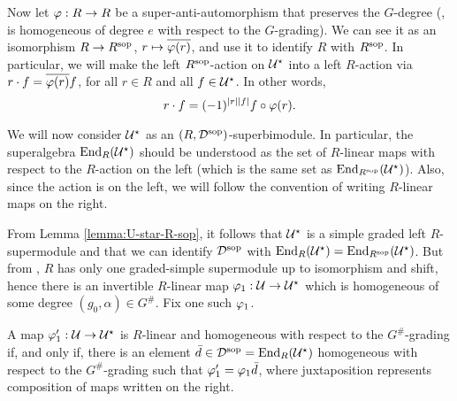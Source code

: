 
Now let $\varphi: R\to R$ be a super-anti-automorphism that preserves the $G$-degree (\ie, is homogeneous of degree $e$ with respect to the $G$-grading).
We can see it as an isomorphism $R\to R^{\mathrm{sop}}$, $r \mapsto \overline{ \varphi(r)}$, and use it to identify $R$ with $R^{\mathrm{sop}}$.
In particular, we will make the left $R^{\mathrm{sop}}$-action on $\mathcal U^\star$ into a left $R$-action via $r\cdot f = \overline{\varphi(r)}f$, for all $r\in R$ and all $f\in \mathcal U^\star$.
In other words,
%
\begin{equation}\label{eq:R-action-back-on-the-right}
	r\cdot f = (-1)^{|r||f|} f \circ \varphi(r) .
\end{equation}

We will now consider $\mathcal U^\star$ as an $(R,\mathcal{D}^{\mathrm{sop}})$-superbimodule.
In particular, the superalgebra $\operatorname{End}_R(\mathcal U^\star)$ should be understood as the set of $R$-linear maps with respect to the $R$-action on the left (which is the same set as $\operatorname{End}_{R^{\mathrm{sop}}} (\mathcal U^\star)$).
Also, since the action is on the left, we will follow the convention of writing $R$-linear maps on the right.

From Lemma \ref{lemma:U-star-R-sop}, it follows that $\mathcal U^\star$ is a simple graded left $R$-supermodule and that we can identify $\mathcal{D}^{\mathrm{sop}}$ with $\operatorname{End}_R (\mathcal U^\star) = \operatorname{End}_{R^{\mathrm{sop}}} (\mathcal U^\star)$.
But from \cite[Lemma 2.7]{livromicha}, $R$ has only one graded-simple supermodule up to isomorphism and shift, hence there is an invertible $R$-linear map $\varphi_1: \mathcal U \to \mathcal U^\star$ which is homogeneous of some degree $(g_0, \alpha)\in G^\#$.
Fix one such $\varphi_1$.

\begin{lemma}\label{lemma:nonuniqueness-of-vphi1}
	A map $\varphi_1' : \mathcal U \to \mathcal U^\star$ is $R$-linear and homogeneous with respect to the $G^\#$-grading if, and only if, there is an element $\bar d\in \mathcal{D}^{\mathrm{sop}} = \operatorname{End}_R (\mathcal U^\star)$ homogeneous with respect to the $G^\#$-grading such that $ \varphi_1' = \varphi_1 \bar d$, where juxtaposition represents composition of maps written on the right.
\end{lemma}

